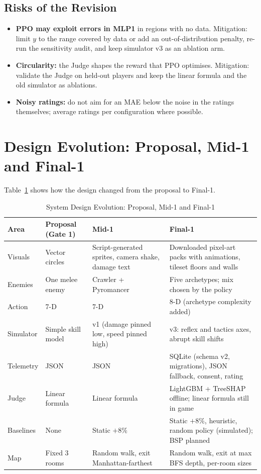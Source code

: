 \subsection{Risks of the Revision}
\begin{itemize}
    \item \textbf{PPO may exploit errors in MLP1} in regions with no data. Mitigation: limit $y$ to the range covered by data or add an out-of-distribution penalty, re-run the sensitivity audit, and keep simulator v3 as an ablation arm.
    \item \textbf{Circularity:} the Judge shapes the reward that PPO optimises. Mitigation: validate the Judge on held-out players and keep the linear formula and the old simulator as ablations.
    \item \textbf{Noisy ratings:} do not aim for an MAE below the noise in the ratings themselves; average ratings per configuration where possible.
\end{itemize}

\section{Design Evolution: Proposal, Mid-1 and Final-1}
Table~\ref{tab:design_evolution} shows how the design changed from the proposal to Final-1.

\begin{table}[!htbp]
\centering
\caption{System Design Evolution: Proposal, Mid-1 and Final-1}
\label{tab:design_evolution}
\scriptsize
\begin{tabular}{p{}p{}p{}p{}}
\toprule
\textbf{Area} & \textbf{Proposal (Gate 1)} & \textbf{Mid-1} & \textbf{Final-1} \\
\midrule
Visuals & Vector circles & Script-generated sprites, camera shake, damage text & Downloaded pixel-art packs with animations, tileset floors and walls \\
Enemies & One melee enemy & Crawler + Pyromancer & Five archetypes; mix chosen by the policy \\
Action & 7-D & 7-D & 8-D (archetype complexity added) \\
Simulator & Simple skill model & v1 (damage pinned low, speed pinned high) & v3: reflex and tactics axes, abrupt skill shifts \\
Telemetry & JSON & JSON & SQLite (schema v2, migrations), JSON fallback, consent, rating \\
Judge & Linear formula & Linear formula & LightGBM + TreeSHAP offline; linear formula still in game \\
Baselines & None & Static $+8\%$ & Static $+8\%$, heuristic, random policy (simulated); BSP planned \\
Map & Fixed 3 rooms & Random walk, exit Manhattan-farthest & Random walk, exit at max BFS depth, per-room sizes \\
\bottomrule
\end{tabular}
\end{table}


